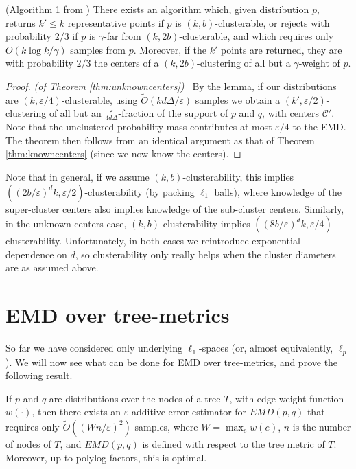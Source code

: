 \documentclass[11pt]{article}
\newcommand{\eps}{\varepsilon}
\newcommand{\tO}{\tilde{O}}
\begin{document}
\begin{lemma}(Algorithm 1 from \cite{cluster})
	There exists an algorithm which, given distribution $p$, returns $k' \le k$
	representative points if $p$ is $(k,b)$-clusterable, or rejects with
	probability $2/3$ if $p$ is $\gamma$-far from $(k,2b)$-clusterable, and
	which requires only $O(k\log k/\gamma)$ samples from $p$. Moreover, if the
	$k'$ points are returned, they are with probability $2/3$ the centers of a
	$(k,2b)$-clustering of all but a $\gamma$-weight of $p$.
\end{lemma}

\begin{proof}\emph{(of Theorem \ref{thm:unknowncenters})\ }
By the lemma, if our distributions are $(k,\eps/4)$-clusterable, using
$\tO(kd\Delta/\eps)$ samples we obtain a $(k',\eps/2)$-clustering of all but an
$\frac{\eps}{4d\Delta}$-fraction of the support of $p$ and $q$, with
centers $\mathcal{C}'$. Note that the unclustered probability mass
contributes at most $\eps/4$ to the EMD. The theorem then follows from an identical
argument as that of Theorem \ref{thm:knowncenters} (since we now know the centers).
\end{proof}

Note that in general, if we assume $(k,b)$-clusterability, this implies
$((2b/\eps)^dk,\eps/2)$-clusterability (by packing $\ell_1$ balls), where knowledge
of the super-cluster centers also implies knowledge of the sub-cluster centers.
Similarly, in the unknown centers case, $(k,b)$-clusterability implies
$((8b/\eps)^dk,\eps/4)$-clusterability. Unfortunately, in both cases we
reintroduce exponential dependence on $d$, so clusterability only really helps
when the cluster diameters are as assumed above.

\section{EMD over tree-metrics}

So far we have considered only underlying $\ell_1$-spaces (or, almost equivalently,
$\ell_p$). We will now see what can be done for EMD over tree-metrics, and prove
the following result.

\begin{theorem}
	If $p$ and $q$ are distributions over the nodes of a tree $T$, with
	edge weight function $w(\cdot)$, then there exists an $\eps$-additive-error
	estimator for $EMD(p,q)$ that requires only $\tilde{O}((Wn/\eps)^2)$
	samples, where $W = \max_e w(e)$, $n$ is the number of nodes of $T$, and $EMD(p,q)$ is defined with
	respect to the tree metric of $T$. Moreover, up to polylog factors,
	this is optimal.
\end{theorem}
\end{document}
